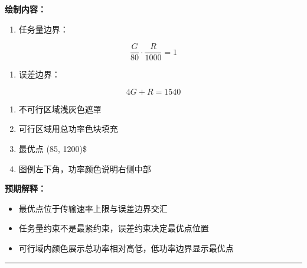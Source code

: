 \documentclass[
]{article}
\begin{document}
\textbf{绘制内容：}

\begin{enumerate}
\def\labelenumi{\arabic{enumi}.}
\item
  任务量边界：
\end{enumerate}

\[\frac{G}{80} \cdot \frac{R}{1000} = 1\]

\begin{enumerate}
\def\labelenumi{\arabic{enumi}.}
\item
  误差边界：
\end{enumerate}

\[4G + R = 1540\]

\begin{enumerate}
\def\labelenumi{\arabic{enumi}.}
\item
  不可行区域浅灰色遮罩
\item
  可行区域用总功率色块填充
\item
  最优点 (85, 1200)\$
\item
  图例左下角，功率颜色说明右侧中部
\end{enumerate}

\textbf{预期解释：}

\begin{itemize}
\item
  最优点位于传输速率上限与误差边界交汇
\item
  任务量约束不是最紧约束，误差约束决定最优点位置
\item
  可行域内颜色展示总功率相对高低，低功率边界显示最优点
\end{itemize}

\begin{center}\rule{0.5\linewidth}{0.5pt}\end{center}
\end{document}
